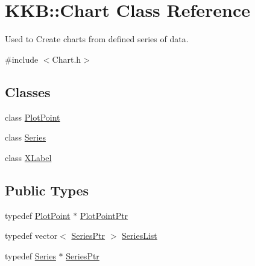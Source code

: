 \hypertarget{class_k_k_b_1_1_chart}{}\section{K\+KB\+:\+:Chart Class Reference}
\label{class_k_k_b_1_1_chart}


Used to Create chart\textquotesingle{}s from defined series of data.  




{\ttfamily \#include $<$Chart.\+h$>$}

\subsection*{Classes}
\begin{DoxyCompactItemize}
\item 
class \hyperlink{class_k_k_b_1_1_chart_1_1_plot_point}{Plot\+Point}
\item 
class \hyperlink{class_k_k_b_1_1_chart_1_1_series}{Series}
\item 
class \hyperlink{class_k_k_b_1_1_chart_1_1_x_label}{X\+Label}
\end{DoxyCompactItemize}
\subsection*{Public Types}
\begin{DoxyCompactItemize}
\item 
typedef \hyperlink{class_k_k_b_1_1_chart_1_1_plot_point}{Plot\+Point} $\ast$ \hyperlink{class_k_k_b_1_1_chart_a21b9bfd1db3224b28cb59153a8ce0691}{Plot\+Point\+Ptr}
\item 
typedef vector$<$ \hyperlink{class_k_k_b_1_1_chart_aa47e1a77836cdfb0cfbd1409a02edd97}{Series\+Ptr} $>$ \hyperlink{class_k_k_b_1_1_chart_a12eb2f2dbd7deac247e045e406a1eaee}{Series\+List}
\item 
typedef \hyperlink{class_k_k_b_1_1_chart_1_1_series}{Series} $\ast$ \hyperlink{class_k_k_b_1_1_chart_aa47e1a77836cdfb0cfbd1409a02edd97}{Series\+Ptr}
\end{DoxyCompactItemize}
